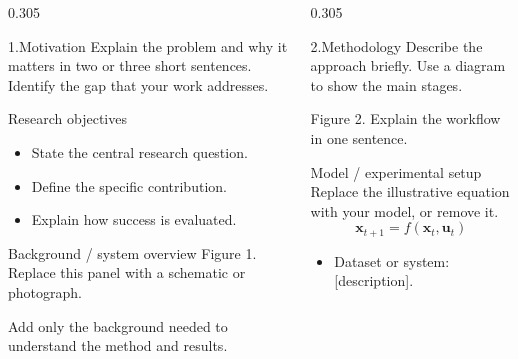 \documentclass[final]{beamer}
\begin{document}
\begin{frame}[t]
\vspace*{1.2cm}
\begin{columns}[t,onlytextwidth]
\begin{column}{0.305\textwidth}
  \begin{block}{1.\enspace Motivation}
    Explain the problem and why it matters in two or three short sentences.
    Identify the gap that your work addresses.
  \end{block}
  \begin{block}{Research objectives}
    \begin{itemize}
      \item State the central research question.
      \item Define the specific contribution.
      \item Explain how success is evaluated.
    \end{itemize}
  \end{block}
  \begin{block}{Background / system overview}
    {\small Figure 1. Replace this panel with a schematic or photograph.}
    \par\medskip
    Add only the background needed to understand the method and results.
  \end{block}
\end{column}
\begin{column}{0.305\textwidth}
  \begin{block}{2.\enspace Methodology}
    Describe the approach briefly. Use a diagram to show the main stages.
    \par\medskip
    {\small Figure 2. Explain the workflow in one sentence.}
  \end{block}
  \begin{block}{Model / experimental setup}
    Replace the illustrative equation with your model, or remove it.
    \[
      \mathbf{x}_{t+1}=f(\mathbf{x}_t,\mathbf{u}_t)
    \]
    \begin{itemize}
      \item Dataset or system: [description].

\end{itemize}
\end{block}
\end{column}
\end{columns}
\end{frame}
\end{document}

